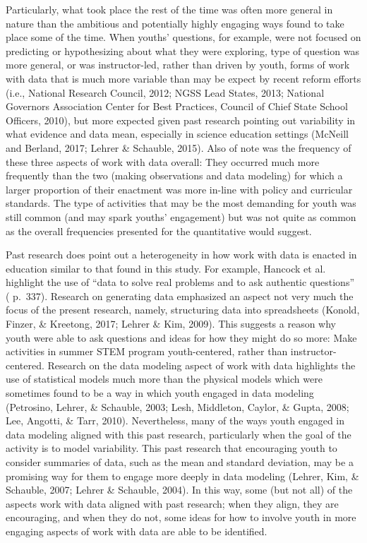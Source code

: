 \documentclass[]{book}
\theoremstyle{definition}
\theoremstyle{definition}
\theoremstyle{definition}
\theoremstyle{remark}
\begin{document}
Particularly, what took place the rest of the time was often more
general in nature than the ambitious and potentially highly engaging
ways found to take place some of the time. When youths' questions, for
example, were not focused on predicting or hypothesizing about what they
were exploring, type of question was more general, or was
instructor-led, rather than driven by youth, forms of work with data
that is much more variable than may be expect by recent reform efforts
(i.e., National Research Council, 2012; NGSS Lead States, 2013; National
Governors Association Center for Best Practices, Council of Chief State
School Officers, 2010), but more expected given past research pointing
out variability in what evidence and data mean, especially in science
education settings (McNeill and Berland, 2017; Lehrer \& Schauble,
2015). Also of note was the frequency of these three aspects of work
with data overall: They occurred much more frequently than the two
(making observations and data modeling) for which a larger proportion of
their enactment was more in-line with policy and curricular standards.
The type of activities that may be the most demanding for youth was
still common (and may spark youths' engagement) but was not quite as
common as the overall frequencies presented for the quantitative would
suggest.

Past research does point out a heterogeneity in how work with data is
enacted in education similar to that found in this study. For example,
Hancock et al. highlight the use of ``data to solve real problems and to
ask authentic questions'' ( p.~337). Research on generating data
emphasized an aspect not very much the focus of the present research,
namely, structuring data into spreadsheets (Konold, Finzer, \& Kreetong,
2017; Lehrer \& Kim, 2009). This suggests a reason why youth were able
to ask questions and ideas for how they might do so more: Make
activities in summer STEM program youth-centered, rather than
instructor-centered. Research on the data modeling aspect of work with
data highlights the use of statistical models much more than the
physical models which were sometimes found to be a way in which youth
engaged in data modeling (Petrosino, Lehrer, \& Schauble, 2003; Lesh,
Middleton, Caylor, \& Gupta, 2008; Lee, Angotti, \& Tarr, 2010).
Nevertheless, many of the ways youth engaged in data modeling aligned
with this past research, particularly when the goal of the activity is
to model variability. This past research that encouraging youth to
consider summaries of data, such as the mean and standard deviation, may
be a promising way for them to engage more deeply in data modeling
(Lehrer, Kim, \& Schauble, 2007; Lehrer \& Schauble, 2004). In this way,
some (but not all) of the aspects work with data aligned with past
research; when they align, they are encouraging, and when they do not,
some ideas for how to involve youth in more engaging aspects of work
with data are able to be identified.
\end{document}
